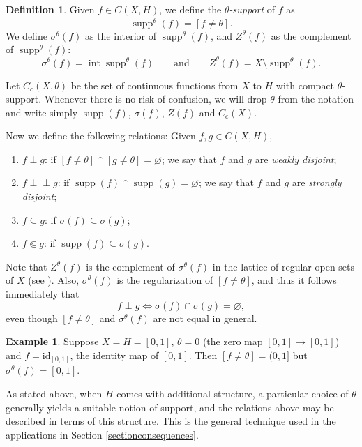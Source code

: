 \documentclass[letter,11pt]{amsart}
\theoremstyle{plain}		\newtheorem{theorem}[generalnumbering]{Theorem}
\theoremstyle{plain}		\newtheorem{corollary}[generalnumbering]{Corollary}
\theoremstyle{definition}		\newtheorem{definition}[generalnumbering]{Definition}
\theoremstyle{definition}		\newtheorem{example}[generalnumbering]{Example}
\theoremstyle{plain}		\newtheorem{proposition}[generalnumbering]{Proposition}
\theoremstyle{plain}		\newtheorem{lemma}[generalnumbering]{Lemma}
\theoremstyle{definition}
\newcommand{\perpp}{\perp\!\!\!\perp}
\DeclareMathOperator{\supp}{supp}
\newcommand{\id}{\mathrm{id}}
\begin{document}
\begin{definition}\label{definitionsigma}
	Given $f\in C(X,H)$, we define the \emph{$\theta$-support} of $f$ as
	\[\supp^\theta(f)=\overline{[f\neq\theta]}.\]
	We define $\sigma^\theta(f)$ as the interior of $\supp^\theta(f)$, and $Z^\theta(f)$ as the complement of $\supp^\theta(f)$:
	\[\sigma^\theta(f)=\operatorname{int}\supp^\theta(f)\qquad\text{and}\qquad Z^\theta(f)=X\setminus\supp^\theta(f).\]
	
	Let $C_c(X,\theta)$ be the set of continuous functions from $X$ to $H$ with compact $\theta$-support. Whenever there is no risk of confusion, we will drop $\theta$ from the notation and write simply $\supp(f)$, $\sigma(f)$, $Z(f)$ and $C_c(X)$.
	
	Now we define the following relations: Given $f,g\in C(X,H)$,
	\begin{enumerate}[label=(\arabic*)]
		\item $f\perp g$: if $[f\neq\theta]\cap[g\neq\theta]=\varnothing$; we say that $f$ and $g$ are \emph{weakly disjoint};
		\item $f\perpp g$: if $\supp(f)\cap\supp(g)=\varnothing$; we say that $f$ and $g$ are \emph{strongly disjoint};
		\item $f\subseteq g$: if $\sigma(f)\subseteq\sigma(g)$;
		\item $f\Subset g$: if $\supp(f)\subseteq\sigma(g)$.
	\end{enumerate}
\end{definition}

Note that $Z^\theta(f)$ is the complement of $\sigma^\theta(f)$ in the lattice of regular open sets of $X$ (see \cite[Chapter 10]{MR2466574}). Also, $\sigma^\theta(f)$ is the regularization of $[f\neq\theta]$, and thus it follows immediately that
\[f\perp g\iff \sigma(f)\cap\sigma(g)=\varnothing,\]
even though $[f\neq \theta]$ and $\sigma^\theta(f)$ are not equal in general.

\begin{example}
	Suppose $X=H=[0,1]$, $\theta=0$ (the zero map $[0,1]\to[0,1]$) and $f=\id_{[0,1]}$, the identity map of $[0,1]$. Then $[f\neq\theta]=(0,1]$ but $\sigma^\theta(f)=[0,1]$.
\end{example}

As stated above, when $H$ comes with additional structure, a particular choice of $\theta$ generally yields a suitable notion of support, and the relations above may be described in terms of this structure. This is the general technique used in the  applications in Section \ref{sectionconsequences}.
\end{document}
